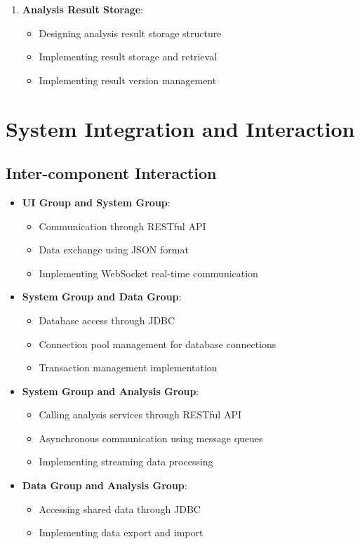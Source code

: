 \documentclass[a4paper,12pt]{article}
\begin{document}
\begin{enumerate}
  \item \textbf{Analysis Result Storage}:
    \begin{itemize}
      \item Designing analysis result storage structure
      \item Implementing result storage and retrieval
      \item Implementing result version management
    \end{itemize}
\end{enumerate}

\section{System Integration and Interaction}

\subsection{Inter-component Interaction}

\begin{itemize}
  \item \textbf{UI Group and System Group}:
    \begin{itemize}
      \item Communication through RESTful API
      \item Data exchange using JSON format
      \item Implementing WebSocket real-time communication
    \end{itemize}
  
  \item \textbf{System Group and Data Group}:
    \begin{itemize}
      \item Database access through JDBC
      \item Connection pool management for database connections
      \item Transaction management implementation
    \end{itemize}
  
  \item \textbf{System Group and Analysis Group}:
    \begin{itemize}
      \item Calling analysis services through RESTful API
      \item Asynchronous communication using message queues
      \item Implementing streaming data processing
    \end{itemize}
  
  \item \textbf{Data Group and Analysis Group}:
    \begin{itemize}
      \item Accessing shared data through JDBC
      \item Implementing data export and import
    \end{itemize}
\end{itemize}
\end{document}

